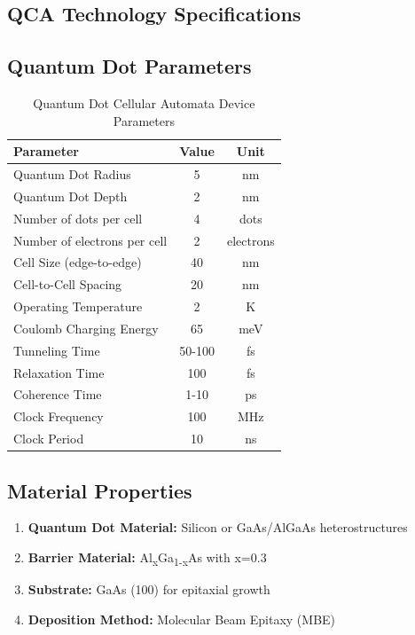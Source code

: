 \documentclass[12pt,a4paper,twoside]{report}
\begin{document}
\begin{appendices}
\section{QCA Technology Specifications}

\subsection{Quantum Dot Parameters}

\begin{table}[H]
\centering
\caption{Quantum Dot Cellular Automata Device Parameters}
\label{tab:qca_device_params}
\begin{tabularx}{\textwidth}{lcc}
\toprule
Parameter & Value & Unit \\
\midrule
Quantum Dot Radius & 5 & nm \\
Quantum Dot Depth & 2 & nm \\
Number of dots per cell & 4 & dots \\
Number of electrons per cell & 2 & electrons \\
Cell Size (edge-to-edge) & 40 & nm \\
Cell-to-Cell Spacing & 20 & nm \\
Operating Temperature & 2 & K \\
Coulomb Charging Energy & 65 & meV \\
Tunneling Time & 50-100 & fs \\
Relaxation Time & 100 & fs \\
Coherence Time & 1-10 & ps \\
Clock Frequency & 100 & MHz \\
Clock Period & 10 & ns \\
\bottomrule
\end{tabularx}
\end{table}

\subsection{Material Properties}

\begin{enumerate}
    \item \textbf{Quantum Dot Material:} Silicon or GaAs/AlGaAs heterostructures
    \item \textbf{Barrier Material:} Al\textsubscript{x}Ga\textsubscript{1-x}As with x=0.3
    \item \textbf{Substrate:} GaAs (100) for epitaxial growth
    \item \textbf{Deposition Method:} Molecular Beam Epitaxy (MBE)
\end{enumerate}


\end{appendices}
\end{document}

